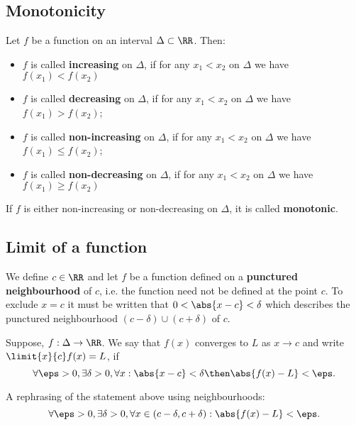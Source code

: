 \documentclass[12pt, a4paper]{article}
\begin{document}
\subsection{Monotonicity}

\begin{definition}
    Let \(f\) be a function on an interval \(\Delta \subset \RR\). Then:
    \begin{itemize}
        \item \(f\) is called \textbf{increasing} on \(\Delta\), if for any \(x_1<x_2\) on \(\Delta\) we have \(f(x_1)<f(x_2)\)
        \item \(f\) is called \textbf{decreasing} on \(\Delta\), if for any \(x_1<x_2\) on \(\Delta\) we have \(f(x_1)>f(x_2)\);
        \item \(f\) is called \textbf{non-increasing} on \(\Delta\), if for any \(x_1 < x_2\) on \(\Delta\) we have \(f(x_1)\leq f(x_2)\);
        \item \(f\) is called \textbf{non-decreasing} on \(\Delta\), if for any \(x_1<x_2\) on \(\Delta\) we have \(f(x_1)\geq f(x_2)\)
    \end{itemize}
\end{definition}

\begin{definition}
    If \(f\) is either non-increasing or non-decreasing on \(\Delta\), it is called \textbf{monotonic}.
\end{definition}

\subsection{Limit of a function}

We define \(c \in \RR\) and let \(f\) be a function defined on a \textbf{punctured neighbourhood} of \(c\), i.e. the function need not be defined at the point \(c\). To exclude \(x=c\) it must be written that \(0<\abs{x-c}<\delta\) which describes the punctured neighbourhood \((c-\delta) \cup (c+\delta)\) of \(c\).

\begin{definition}
    Suppose, \(f : \Delta \to \RR\). We say that \(f(x)\) converges to \(L\) as \(x \to c\) and write \(\limit{x}{c} f(x)=L\), if 
    \[\forall \eps>0, \exists \delta>0, \forall x : \abs{x-c}<\delta \then \abs{f(x)-L}<\eps.\]
\end{definition}

\begin{mdremark}
    A rephrasing of the statement above using neighbourhoods:
    \[\forall \eps>0, \exists \delta>0, \forall x \in (c-\delta, c+\delta) : \abs{f(x)-L} <\eps.\]
\end{mdremark}
\end{document}
